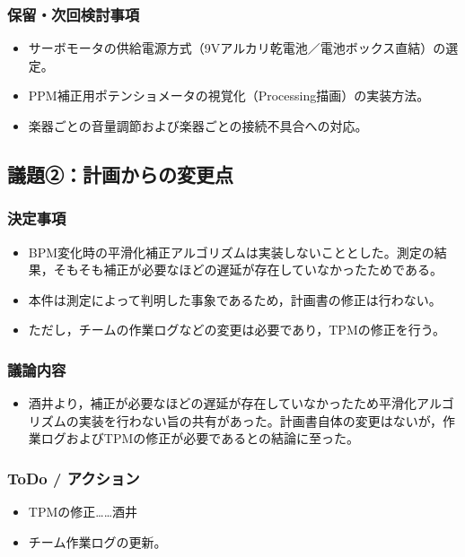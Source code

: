\documentclass[a4paper,12pt]{ltjsarticle}
\begin{document}
\subsubsection*{保留・次回検討事項}
\begin{itemize}[leftmargin=1.5em]
  \item サーボモータの供給電源方式（9Vアルカリ乾電池／電池ボックス直結）の選定。
  \item PPM補正用ポテンショメータの視覚化（Processing描画）の実装方法。
  \item 楽器ごとの音量調節および楽器ごとの接続不具合への対応。
\end{itemize}

\subsection*{議題②：計画からの変更点}

\subsubsection*{決定事項}
\begin{itemize}[leftmargin=1.5em]
  \item BPM変化時の平滑化補正アルゴリズムは実装しないこととした。測定の結果，そもそも補正が必要なほどの遅延が存在していなかったためである。
  \item 本件は測定によって判明した事象であるため，計画書の修正は行わない。
  \item ただし，チームの作業ログなどの変更は必要であり，TPMの修正を行う。
\end{itemize}

\subsubsection*{議論内容}
\begin{itemize}[leftmargin=1.5em]
  \item 酒井より，補正が必要なほどの遅延が存在していなかったため平滑化アルゴリズムの実装を行わない旨の共有があった。計画書自体の変更はないが，作業ログおよびTPMの修正が必要であるとの結論に至った。
\end{itemize}

\subsubsection*{ToDo / アクション}
\begin{itemize}[leftmargin=1.5em]
  \item TPMの修正……酒井
  \item チーム作業ログの更新。
\end{itemize}
\end{document}
